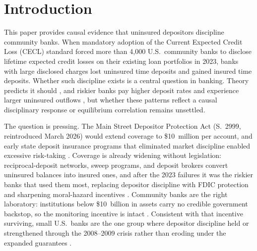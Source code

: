 \section{Introduction}
\label{sec:intro}

This paper provides causal evidence that uninsured depositors
discipline community banks.  When mandatory adoption of the Current
Expected Credit Loss (CECL) standard forced more than 4,000
U.S.\ community banks to disclose lifetime expected credit losses on
their existing loan portfolios in 2023, banks with large disclosed
charges lost uninsured time deposits and gained insured time
deposits.  Whether such discipline exists is
a central question in banking.  Theory predicts it should
\citep{calomiris1991role, diamond2001liquidity}, and riskier banks pay
higher deposit rates and experience larger uninsured outflows
\citep{hannan1988bank, park1995market, park1998market,
martinez2001depositors,
maechler2006dynamic, iyer2016tale, egan2017deposit, chen2024liquidity},
but whether these
patterns reflect a causal disciplinary response or equilibrium
correlation remains unsettled.

The question is pressing.  The Main
Street Depositor Protection Act (S.~2999, reintroduced March 2026)
would extend coverage to \$10~million per account, and early state
deposit insurance programs that eliminated market discipline enabled
excessive risk-taking \citep{calomiris2019stealing}.  Coverage is
already widening without legislation: reciprocal-deposit networks,
sweep programs, and deposit brokers convert uninsured balances into
insured ones, and after the 2023 failures it was the riskier banks
that used them most, replacing depositor discipline with FDIC
protection and sharpening moral-hazard incentives
\citep{huberdeau2025adverse}.  Community banks
are the right laboratory: institutions below \$10~billion in assets
carry no credible government backstop, so the monitoring incentive is
intact \citep{o1990deposit, flannery1996evidence}.  Consistent with
that incentive surviving, small U.S.\ banks are the one group where
depositor discipline held or strengthened through the 2008--2009
crisis rather than eroding under the expanded guarantees
\citep{berger2015depositors}.


